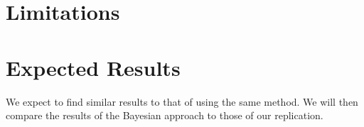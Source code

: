 \documentclass[conference]{IEEEtran}
\begin{document}
\section{Limitations}


\section{Expected Results}

We expect to find similar results to that of \cite{ali2020cheating} using the same method. We will then compare the results of the Bayesian approach to those of our replication.



\end{document}
